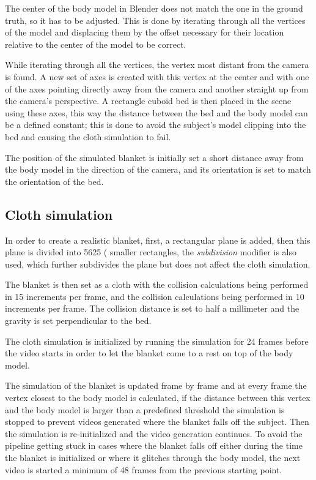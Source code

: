 \documentclass[conference]{IEEEtran}
\begin{document}
The center of the body model in Blender does not match the one in the ground truth, so it has to be adjusted. This is done by iterating through all the vertices of the model and displacing them by the offset necessary for their location relative to the center of the model to be correct.

While iterating through all the vertices, the vertex most distant from the camera is found. A new set of axes is created with this vertex at the center and with one of the axes pointing directly away from the camera and another straight up from the camera's perspective. A rectangle cuboid bed is then placed in the scene using these axes, this way the distance between the bed and the body model can be a defined constant; this is done to avoid the subject's model clipping into the bed and causing the cloth simulation to fail.

The position of the simulated blanket is initially set a short distance away from the body model in the direction of the camera, and its orientation is set to match the orientation of the bed.


\subsection{Cloth simulation}
In order to create a realistic blanket, first, a rectangular plane is added, then this plane is divided into 5625 ( smaller rectangles, the \textit{subdivision} modifier is also used, which further subdivides the plane but does not affect the cloth simulation. 

The blanket is then set as a cloth with the collision calculations being performed in 15 increments per frame, and the collision calculations being performed in 10 increments per frame. The collision distance is set to half a millimeter and the gravity is set perpendicular to the bed.

The cloth simulation is initialized by running the simulation for 24 frames before the video starts in order to let the blanket come to a rest on top of the body model.

The simulation of the blanket is updated frame by frame and at every frame the vertex closest to the body model is calculated, if the distance between this vertex and the body model is larger than a predefined threshold the simulation is stopped to prevent videos generated where the blanket falls off the subject. Then the simulation is re-initialized and the video generation continues. To avoid the pipeline getting stuck in cases where the blanket falls off either during the time the blanket is
initialized or where it glitches through the body model, the next video is started a minimum of 48 frames from the previous starting point.
\end{document}
